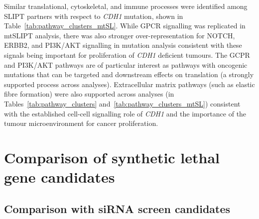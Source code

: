 Similar translational, cytoskeletal, and immune processes were identified among SLIPT partners with respect to \textit{CDH1} mutation, shown in Table~\ref{tab:pathway_clusters_mtSL}. While GPCR signalling was replicated in mtSLIPT analysis, there was also stronger over-representation for NOTCH, ERBB2, and PI3K/AKT signalling in mutation analysis consistent with these signals being important for proliferation of \textit{CDH1} deficient tumours. The GCPR and PI3K/AKT pathways are of particular interest as pathways with oncogenic mutations that can be targeted and downstream effects on translation (a strongly supported process across analyses). Extracellular matrix pathways (such as elastic fibre formation) were also supported across analyses (in Tables~\ref{tab:pathway_clusters} and~\ref{tab:pathway_clusters_mtSL}) consistent with the established cell-cell signalling role of \textit{CDH1} and the importance of the tumour microenvironment for cancer proliferation.



\FloatBarrier

\section{Comparison of synthetic lethal gene candidates} \label{chapt3:compare_SL_genes}  



\subsection{Comparison with siRNA screen candidates} \label{chapt3:primary_screen}

